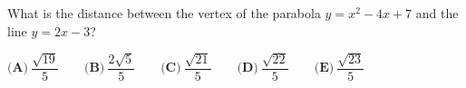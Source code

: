 What is the distance between the vertex of the parabola $y=x^2-4x+7$ and the line $y=2x-3$?

$\textbf{(A)}\ \dfrac{\sqrt{19}}{5}\qquad\textbf{(B)}\ \dfrac{2\sqrt5}{5}\qquad\textbf{(C)}\ \dfrac{\sqrt{21}}{5}\qquad\textbf{(D)}\ \dfrac{\sqrt{22}}{5}\qquad\textbf{(E)}\ \dfrac{\sqrt{23}}{5}$
